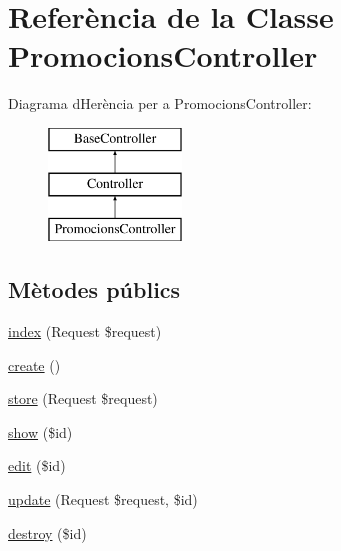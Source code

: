\hypertarget{class_app_1_1_http_1_1_controllers_1_1_promocions_controller}{}\section{Referència de la Classe Promocions\+Controller}
\label{class_app_1_1_http_1_1_controllers_1_1_promocions_controller}
Diagrama d\textquotesingle{}Herència per a Promocions\+Controller\+:\begin{figure}[H]
\begin{center}
\leavevmode
\includegraphics[height=3.000000cm]{class_app_1_1_http_1_1_controllers_1_1_promocions_controller}
\end{center}
\end{figure}
\subsection*{Mètodes públics}
\begin{DoxyCompactItemize}
\item 
\mbox{\hyperlink{class_app_1_1_http_1_1_controllers_1_1_promocions_controller_ab567a949f50e20ea3d95ad062a17e3c3}{index}} (Request \$request)
\item 
\mbox{\hyperlink{class_app_1_1_http_1_1_controllers_1_1_promocions_controller_a435e7d7525d4bcd0ed5e34a469f3adf6}{create}} ()
\item 
\mbox{\hyperlink{class_app_1_1_http_1_1_controllers_1_1_promocions_controller_a9ef485163104597c12185b53cdacf638}{store}} (Request \$request)
\item 
\mbox{\hyperlink{class_app_1_1_http_1_1_controllers_1_1_promocions_controller_ae4914d07a9bbe4aede7a5dea759f6287}{show}} (\$id)
\item 
\mbox{\hyperlink{class_app_1_1_http_1_1_controllers_1_1_promocions_controller_a459ed16587e3a50b39b672c7e473abc5}{edit}} (\$id)
\item 
\mbox{\hyperlink{class_app_1_1_http_1_1_controllers_1_1_promocions_controller_affb03cc19897a1800a0f411264d6c7cc}{update}} (Request \$request, \$id)
\item 
\mbox{\hyperlink{class_app_1_1_http_1_1_controllers_1_1_promocions_controller_a726fa8a4b4b187b9ca32ba427aac8137}{destroy}} (\$id)
\end{DoxyCompactItemize}


